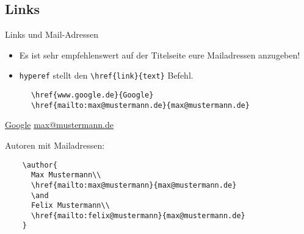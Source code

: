 \subsection{Links}
\begin{frame}[fragile]{Links und Mail-Adressen}
  \begin{itemize}
    \item Es ist sehr empfehlenswert auf der Titelseite eure Mailadressen anzugeben!
    \item \texttt{hyperef} stellt den \lstinline+\href{link}{text}+ Befehl.
  \end{itemize}
  \begin{CodeExample}{0.7}
    \begin{lstlisting}
      \href{www.google.de}{Google}
      \href{mailto:max@mustermann.de}{max@mustermann.de}
    \end{lstlisting}
    \CodeResult
    \href{www.google.de}{Google}
    \href{mailto:max@mustermann.de}{max@mustermann.de}
  \end{CodeExample}
  \begin{block}{Autoren mit Mailadressen:}
    \begin{lstlisting}
    \author{
      Max Mustermann\\
      \href{mailto:max@mustermann}{max@mustermann.de}
      \and
      Felix Mustermann\\
      \href{mailto:felix@mustermann}{max@mustermann.de}
    }
    \end{lstlisting}
  \end{block}
\end{frame}
